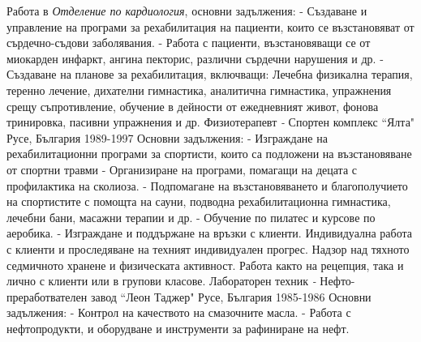 {
Работа в \textit{Отделение по кардиология}, основни задължения:
\newline
\hspace{3ex} - Създаване и управление на програми за рехабилитация на пациенти, които се възстановяват от сърдечно-съдови заболявания.
\newline
\hspace{3ex} - Работа с пациенти, възстановяващи се от миокарден инфаркт, ангина пекторис, различни сърдечни нарушения и др.
\newline
\hspace{3ex} - Създаване на планове за рехабилитация, включващи: Лечебна физикална терапия, теренно лечение,  дихателни гимнастика, аналитична гимнастика, упражнения срещу съпротивление, обучение в дейности от ежедневният живот, фонова тринировка, пасивни упражнения и др.
}
\vspace{+3mm}
\cventry
{Физиотерапевт \textit{-}  Спортен комплекс “Ялта"}
{Русе, България 1989-1997}
{
Основни задължения:
\newline
\hspace{3ex} - Изграждане на рехабилитационни програми за спортисти, които са подложени на възстановяване от спортни травми
\newline
\hspace{3ex} - Организиране на програми, помагащи на децата с профилактика на сколиоза.
\newline
\hspace{3ex} - Подпомагане на възстановяването и благополучието на спортистите с помощта на сауни, подводна рехабилитационна гимнастика, лечебни бани, масажни терапии и др.
\newline
\hspace{3ex} - Обучение по пилатес и курсове по аеробика.
\newline
\hspace{3ex} - Изграждане и поддържане на връзки с клиенти. Индивидуална работа с клиенти и проследяване на техният индивидуален прогрес. Надзор над тяхното седмичното хранене и физическата активност. Работа както на рецепция, така и лично с клиенти или в групови класове.
}
\vspace{+3mm}
\cventry
{Лабораторен техник \textit{-} Нефто-преработвателен завод “Леон Таджер"}
{Русе, България 1985-1986}
{
Основни задължения:
\newline
\hspace{3ex} - Контрол на качеството на смазочните масла.
\newline
\hspace{3ex} - Работа с нефтопродукти, и оборудване и инструменти за рафиниране на нефт.
}